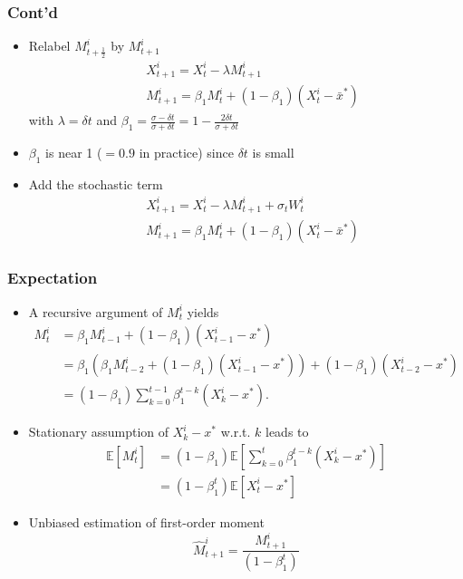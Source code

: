 \documentclass{beamer}
\begin{document}
\begin{frame}
\frametitle{Cont'd}

\begin{itemize}
	\item[] Relabel $M^i_{t+\frac{1}{2}}$ by $M^i_{t+1}$
	\begin{equation*}
	\begin{aligned}
	&X^i_{t+1} = X_t^i - \lambda M^i_{t+1}  \\
	\ &M^i_{t+1} = \beta_1 M^i_{t} + (1-\beta_1) (X_t^i - \bar{x}^*)
	\end{aligned}
	\end{equation*}
	with $\lambda = \delta t $ and $\beta_1 =\frac{\sigma - \delta t}{\sigma+ \delta t} =1 - \frac{2\delta t }{\sigma  + \delta t }  $
	\item[] $\beta_1$ is near 1 ($=0.9$ in practice) since $\delta t$ is small
	\item[] Add the stochastic term
		\begin{equation*}
	\begin{aligned}
	&X^i_{t+1} = X_t^i - \lambda M^i_{t+1} + \sigma_t  W^i_t \\
	\ &M^i_{t+1} = \beta_1 M^i_{t} + (1-\beta_1) (X_t^i - \bar{x}^*)
	\end{aligned}
	\end{equation*}
\end{itemize}

\end{frame}

\begin{frame}
\frametitle{Expectation}

\begin{itemize}
	\item[] A recursive argument of $M_t^i$ yields
	\begin{equation*}
	\begin{aligned}
	M^i_t & = \beta_1 M^i_{t-1} + (1-\beta_1)(X^i_{t-1} - x^*)\\
	& = \beta_1 (\beta_1 M^i_{t-2} + (1-\beta_1) (X_{t-1}^i - x^*)) + (1-\beta_1) (X^i_{t-2} - x^*)\\
	& = (1-\beta_1) \sum_{k=0}^{t-1} \beta_1^{t-k} (X_{k}^i - x^*).
	\end{aligned}
	\end{equation*}
	\item[] Stationary assumption of $X_{k}^i - x^*$ w.r.t. $k$ leads to
	\begin{equation*}
	\begin{aligned}
	\mathbb{E} [M^i_t] & =(1-\beta_1)   \mathbb{E} [\sum_{k=0}^t \beta_1^{t-k} (X_{k}^i - x^*)] \\
	&= (1-\beta_1^t)  \mathbb{E}[ X_{t}^i - x^* ]
	\end{aligned}
	\end{equation*}
	\item[] Unbiased estimation of first-order moment
	\[
	\hat{M}^i_{t+1} = \frac{M^i_{t+1}}{(1-\beta_1^t)}
	\]
	\end{itemize}	

\end{frame}
\end{document}
